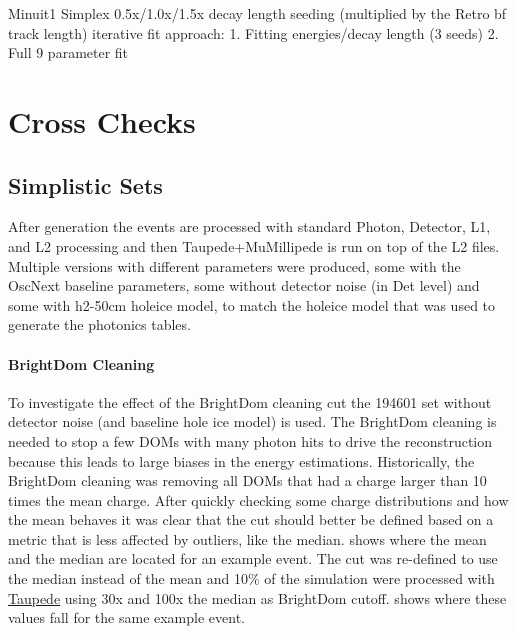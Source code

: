 Minuit1 Simplex
0.5x/1.0x/1.5x decay length seeding (multiplied by the Retro bf track length)
iterative fit approach: 1. Fitting energies/decay length (3 seeds) 2. Full 9 parameter fit





\section{Cross Checks}
\subsection{Simplistic Sets}

After generation the events are processed with standard Photon, Detector, L1, and L2 processing and then Taupede+MuMillipede is run on top of the L2 files. Multiple versions with different parameters were produced, some with the OscNext baseline parameters, some without detector noise (in Det level) and some with h2-50cm holeice model, to match the holeice model that was used to generate the photonics tables.


\paragraph{BrightDom Cleaning}

To investigate the effect of the BrightDom cleaning cut the 194601 set without detector noise (and baseline hole ice model) is used. The BrightDom cleaning is needed to stop a few DOMs with many photon hits to drive the reconstruction because this leads to large biases in the energy estimations. Historically, the BrightDom cleaning was removing all DOMs that had a charge larger than 10 times the mean charge. After quickly checking some charge distributions and how the mean behaves it was clear that the cut should better be defined based on a metric that is less affected by outliers, like the median.  shows where the mean and the median are located for an example event. The cut was re-defined to use the median instead of the mean and 10\% of the simulation were processed with \href{https://github.com/LeanderFischer/I3_HNL_Decay/blob/a6838ec48e0a2d4f6547cbe064d2928ec55fb76d/submission_scripts/process/process_Taupede.py}{Taupede} using 30x and 100x the median as BrightDom cutoff.  shows where these values fall for the same example event.

